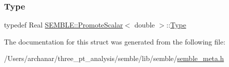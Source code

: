 \subsubsection{\texorpdfstring{Type}{Type}\hspace{0.1cm}{\footnotesize\ttfamily [2/2]}}
{\footnotesize\ttfamily typedef Real \mbox{\hyperlink{structSEMBLE_1_1PromoteScalar}{S\+E\+M\+B\+L\+E\+::\+Promote\+Scalar}}$<$ double $>$\+::\mbox{\hyperlink{structSEMBLE_1_1PromoteScalar_3_01double_01_4_adf38a6733a66eb206758760f6481a791}{Type}}}



The documentation for this struct was generated from the following file\+:\begin{DoxyCompactItemize}
\item 
/\+Users/archanar/three\+\_\+pt\+\_\+analysis/semble/lib/semble/\mbox{\hyperlink{lib_2semble_2semble__meta_8h}{semble\+\_\+meta.\+h}}\end{DoxyCompactItemize}
